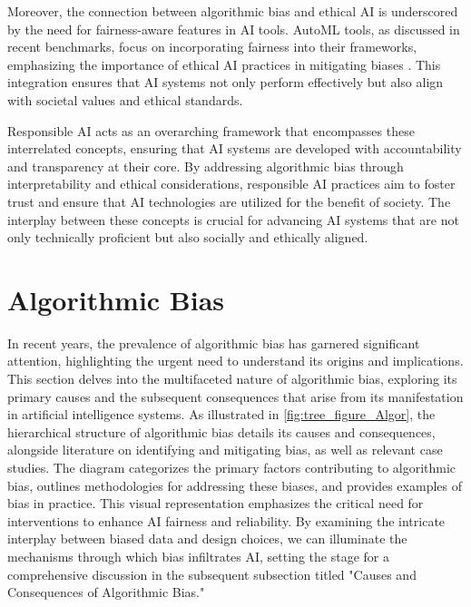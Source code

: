 Moreover, the connection between algorithmic bias and ethical AI is underscored by the need for fairness-aware features in AI tools. AutoML tools, as discussed in recent benchmarks, focus on incorporating fairness into their frameworks, emphasizing the importance of ethical AI practices in mitigating biases \cite{narayanan2023democratizecareneedfairness}. This integration ensures that AI systems not only perform effectively but also align with societal values and ethical standards.



Responsible AI acts as an overarching framework that encompasses these interrelated concepts, ensuring that AI systems are developed with accountability and transparency at their core. By addressing algorithmic bias through interpretability and ethical considerations, responsible AI practices aim to foster trust and ensure that AI technologies are utilized for the benefit of society. The interplay between these concepts is crucial for advancing AI systems that are not only technically proficient but also socially and ethically aligned.













\section{Algorithmic Bias} \label{sec:Algorithmic Bias}


In recent years, the prevalence of algorithmic bias has garnered significant attention, highlighting the urgent need to understand its origins and implications. This section delves into the multifaceted nature of algorithmic bias, exploring its primary causes and the subsequent consequences that arise from its manifestation in artificial intelligence systems. As illustrated in \autoref{fig:tree_figure_Algor}, the hierarchical structure of algorithmic bias details its causes and consequences, alongside literature on identifying and mitigating bias, as well as relevant case studies. The diagram categorizes the primary factors contributing to algorithmic bias, outlines methodologies for addressing these biases, and provides examples of bias in practice. This visual representation emphasizes the critical need for interventions to enhance AI fairness and reliability. By examining the intricate interplay between biased data and design choices, we can illuminate the mechanisms through which bias infiltrates AI, setting the stage for a comprehensive discussion in the subsequent subsection titled "Causes and Consequences of Algorithmic Bias."

